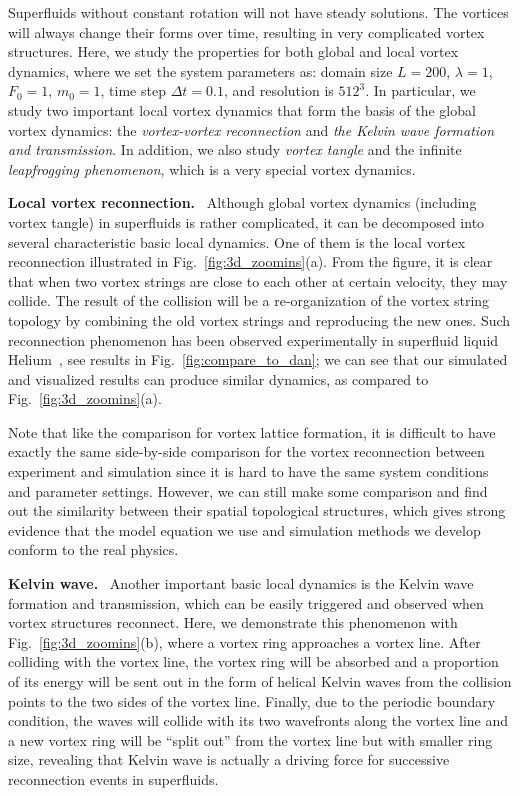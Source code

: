 \documentclass[10pt,journal,compsoc,twoside]{IEEEtran}
\begin{document}
	Superfluids without constant rotation will not have steady solutions.
	The vortices will always change their forms over time, resulting in very complicated vortex structures.
	Here, we study the properties for both global and local vortex dynamics, where we set the system parameters as: domain size $L = 200$, $\lambda = 1$, $F_0 = 1$, $m_0 = 1$, time step $\Delta t= 0.1$, and resolution is $512^3$.
	In particular, we study two important local vortex dynamics that form the basis of the global vortex dynamics: the {\em vortex-vortex reconnection} and {\em the Kelvin wave formation and transmission}.
	In addition, we also study {\em vortex tangle} and the infinite {\em leapfrogging phenomenon}, which is a very special vortex dynamics.
	
	\vspace{0.15cm}
	\noindent
	\textbf{Local vortex reconnection.} \
	Although global vortex dynamics (including vortex tangle) in superfluids is rather complicated, it can be decomposed into several characteristic basic local dynamics.
	One of them is the local vortex reconnection illustrated in Fig.~\ref{fig:3d_zoomins}(a).
	From the figure, it is clear that when two vortex strings are close to each other at certain velocity, they may collide.
	The result of the collision will be a re-organization of the vortex string topology by combining the old vortex strings and reproducing the new ones.
	Such reconnection phenomenon has been observed experimentally in superfluid liquid Helium~\cite{Dan_14}, see results in Fig.~\ref{fig:compare_to_dan}; we can see that our simulated and visualized results can produce similar dynamics, as compared to Fig.~\ref{fig:3d_zoomins}(a).
	

	Note that like the comparison for vortex lattice formation, it is difficult to have exactly the same side-by-side comparison for the vortex reconnection between experiment and simulation since it is hard to have the same system conditions and parameter settings.
	However, we can still make some comparison and find out the similarity between their spatial topological structures, which gives strong evidence that the model equation we use and simulation methods we develop conform to the real physics.
	

	\vspace{0.15cm}
	\noindent
	\textbf{Kelvin wave.} \
	Another important basic local dynamics is the Kelvin wave formation and transmission, which can be easily triggered and observed when vortex structures reconnect.
	Here, we demonstrate this phenomenon with Fig.~\ref{fig:3d_zoomins}(b), where a vortex ring approaches a vortex line.
	After colliding with the vortex line, the vortex ring will be absorbed and a proportion of its energy will be sent out in the form of helical Kelvin waves from the collision points to the two sides of the vortex line.
	Finally, due to the periodic boundary condition, the waves will collide with its two wavefronts along the vortex line and a new vortex ring will be ``split out'' from the vortex line but with smaller ring size, revealing that Kelvin wave is actually a driving force for successive reconnection events in superfluids.
\end{document}
